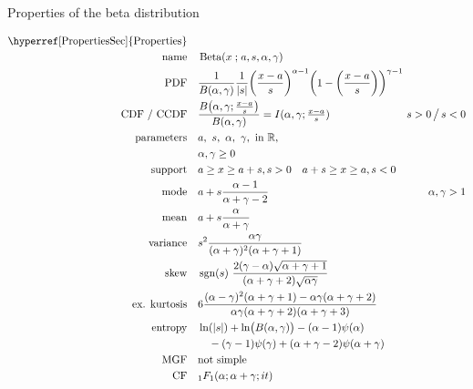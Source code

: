 

\begin{table*}[tp]
\caption[Beta distribution -- Properties]{Properties of the beta distribution}
 \begin{align*}
 \text{\hyperref[PropertiesSec]{Properties}}  \quad& \\
\text{name} \quad & \op{Beta}(x\given a,s,\alpha, \gamma) 	\checked
\\
\text{PDF}\quad &    \frac{1}{B(\alpha, \gamma)}\frac{1}{ \Left|s\Right|}
\Left(\frac{x-a}{s} \Right)^{\alpha -1} \Left (1-\Left(\frac{x-a}{s}\Right)\Right)^{\gamma -1}	\checked
\hspace{-8em}
\\
\text{CDF / CCDF} \quad  & 
 \frac{B\Left( \alpha,\gamma; \sfrac{x-a}{s} \Right)}{B(\alpha,\gamma)} = I( \alpha,\gamma; \sfrac{x-a}{s})
 \checked
& {s} >0 \,\big/ \, {s} <0
\\ 
\text{parameters}\quad &   a,\ s,\ \alpha,\ \gamma, \text{ in } \Real, \\ &  \alpha,\gamma\geq0	\checked
\\
\text{support} \quad &  a \geq x \geq a+s , s>0 \quad a+s \geq x \geq a , s<0 
\\
\text{mode} \quad  &a + s \frac{\alpha-1}{\alpha+\gamma-2}\checked  & \alpha,\gamma > 1
\\
\text{mean} \quad  &   a + s \frac{\alpha}{\alpha+\gamma}	\checked
\\
\text{variance} \quad   & s^2 \frac{\alpha\gamma}{(\alpha+\gamma)^2(\alpha+\gamma+1)} \checked
\\
\text{skew} \quad  &   \op{sgn}(s)\ \frac{2(\gamma-\alpha) \sqrt{\alpha+\gamma+1} }{(\alpha+\gamma+2)\sqrt{\alpha\gamma} } \checked
\\
\text{ex. kurtosis} \quad  &  6\frac{(\alpha-\gamma)^2(\alpha+\gamma+1) - \alpha\gamma(\alpha+\gamma+2) }{\alpha\gamma(\alpha+\gamma+2)(\alpha+\gamma+3)} \checked
\\
\text{entropy} \quad  &  \ln(|s|) + \ln\bigl(B(\alpha,\gamma)\bigr)-(\alpha-1)\psi(\alpha)
\\ &\quad {}-(\gamma-1)\psi(\gamma)+(\alpha+\gamma-2)\psi(\alpha+\gamma) \checked
\\
\text{MGF} \quad  &  \text{not simple} 
\\
\text{CF} \quad  &  {}_{1}F_{1}(\alpha; \alpha+\gamma ; i t) \checked
\end{align*}
\end{table*}

